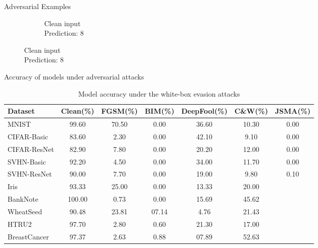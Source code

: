 \documentclass[9pt]{beamer}
\begin{document}
\begin{frame}{Adversarial Examples}
\begin{figure}
\begin{subfigure}[t]{0.23\linewidth}
        \caption{Clean input\\Prediction: 8}
        \label{fig:clean}
    \end{subfigure}
\end{figure}

\hyperlink{preprocessing}{}
\hyperlink{adv_training}{}
\hyperlink{stats}{}
\end{frame}

\begin{frame}{Accuracy of models under adversarial attacks}
\begin{table}
    \centering
    \footnotesize
    \begin{tabular}{|l|c|c|c|c|c|c|}
        \hline
        {Dataset} & {Clean(\%)} & {FGSM(\%)} & {BIM(\%)} & {DeepFool(\%)} & {C\&W(\%)} & {JSMA(\%)} \\
        \hline
        MNIST & 99.60 & 70.50 & 0.00 & 36.60 & 10.30 & 0.00 \\
        CIFAR-Basic & 83.60 & 2.30 & 0.00 & 42.10 & 9.10 & 0.00 \\
        CIFAR-ResNet & 82.90 & 7.80 & 0.00 & 20.20 & 12.00 & 0.00 \\
        SVHN-Basic & 92.20 & 4.50 & 0.00 & 34.00 & 11.70 & 0.00 \\
        SVHN-ResNet & 90.00 & 7.70 & 0.00 & 19.00 & 9.80 & 0.10 \\
        Iris & 93.33 & 25.00 & 0.00 & 13.33 & 20.00 & \\
        BankNote & 100.00 & 0.73 & 0.00 & 15.69 & 45.62 & \\
        WheatSeed & 90.48 & 23.81 & 07.14 & 4.76 & 21.43 & \\
        HTRU2 & 97.70 & 2.80 & 0.60 & 21.30 & 17.00 & \\
        BreastCancer & 97.37 & 2.63 & 0.88 & 07.89 & 52.63 & \\
        \hline
    \end{tabular}
    \caption{Model accuracy under the white-box evasion attacks}
    \label{table:adv_acc}
\end{table}
\end{frame}
\end{document}
